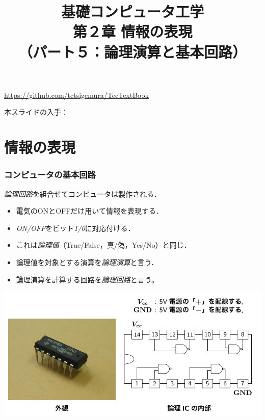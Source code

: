 \documentclass[handout]{beamer}        %
\begin{document}
\title{基礎コンピュータ工学\\第２章 情報の表現\\
      （パート５：論理演算と基本回路）}
\date{}

\begin{frame}
  \titlepage
  \centerline{\url{https://github.com/tctsigemura/TecTextBook}}
  \vfill
  \centerline{本スライドの入手：
    }
\end{frame}


\section{情報の表現}
\begin{frame}
  \frametitle{コンピュータの基本回路}
  \emph{論理回路}を組合せてコンピュータは製作される．
  \begin{itemize}
  \item 電気のONとOFFだけ用いて情報を表現する．
  \item \emph{ON/OFF}をビット\emph{1/0}に対応付ける．
  \item これは\emph{論理値}（True/False，真/偽，Yes/No）と同じ．
  \item 論理値を対象とする演算を\emph{論理演算}と言う．
  \item 論理演算を計算する回路を\emph{論理回路}と言う。
  \end{itemize}
  \vfill
  \centerline{\includegraphics[scale=0.7]{../Tikz/lic.pdf}}
\end{frame}
\end{document}
